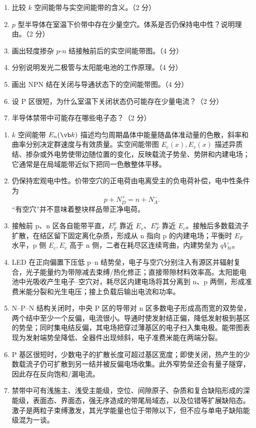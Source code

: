 \begin{question}[20 分]
\begin{enumerate}
  \item 比较 $k$ 空间能带与实空间能带的含义。（2 分）
  \item $p$ 型半导体在室温下价带中存在少量空穴。体系是否仍保持电中性？说明理由。（2 分）
  \item 画出轻度掺杂 $p$-$n$ 结接触前后的实空间能带图。（4 分）
  \item 分别说明发光二极管与太阳能电池的工作原理。（4 分）
  \item 画出 NPN 结在关闭与导通状态下的空间能带图。（4 分）
  \item 设 P 区很短，为什么室温下关闭状态仍可能存在少量电流？（2 分）
  \item 半导体禁带中可能存在哪些电子态？（2 分）
\end{enumerate}


\begin{solution}
\begin{enumerate}
  \item $k$ 空间能带 $E_n(\vb k)$ 描述均匀周期晶体中能量随晶体准动量的色散，斜率和曲率分别决定群速度与有效质量。实空间能带图 $E_c(x),E_v(x)$ 描述异质结、掺杂或外电势使带边随位置的变化，反映载流子势垒、势阱和内建电场；它通常是在局域能带近似下把同一色散整体平移。
  \item 仍保持宏观电中性。价带空穴的正电荷由电离受主的负电荷补偿，电中性条件为
  \[
    p+N_D^+=n+N_A^-.
  \]
  “有空穴”并不意味着整块样品带正净电荷。
  \item 接触前 p、n 区各自能带平直，$E_F^p$ 靠近 $E_v$、$E_F^n$ 靠近 $E_c$。接触后多数载流子扩散，在结区留下固定离化杂质，形成从 n 指向 p 的内建电场；平衡时 $E_F$ 水平，p 侧 $E_c,E_v$ 高于 n 侧，二者在耗尽区连续弯曲，内建势垒为 $qV_{bi}$。
  \item LED 在正向偏置下压低 p--n 结势垒，电子与空穴分别注入有源区并辐射复合，光子能量约为带隙减去束缚/热化修正；直接带隙材料效率高。太阳能电池中光吸收产生电子--空穴对，耗尽区内建电场将其分离到 n、p 两侧，形成准费米能分裂和光生电压；接上负载后输出电流和功率。
  \item N--P--N 结构关闭时，中央 P 区的导带对 n 区多数电子形成高而宽的双势垒，两个结中至少一个反偏，电流很小。导通时使发射结正偏，降低发射极到基区的势垒；同时集电结反偏，其电场把穿过薄基区的电子扫入集电极。能带图表现为发射端势垒降低、全器件出现倾斜，电子准费米能在两端分裂。
  \item P 基区很短时，少数电子的扩散长度可超过基区宽度；即使关闭，热产生的少数载流子仍可扩散到另一结并被反偏电场收集。此外窄势垒还会有量子隧穿，因此存在反向饱和/漏电流。
  \item 禁带中可有浅施主、浅受主能级，空位、间隙原子、杂质和复合缺陷形成的深能级，表面态、界面态，强无序造成的带尾局域态，以及位错等扩展缺陷态。激子是两粒子束缚激发，其光学能量也位于带隙以下，但不应与单电子缺陷能级混为一谈。
\end{enumerate}
\end{solution}
\end{question}

